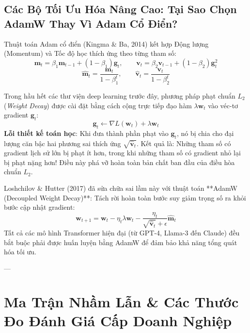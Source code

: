 \subsection{Các Bộ Tối Ưu Hóa Nâng Cao: Tại Sao Chọn AdamW Thay Vì Adam Cổ Điển?}

Thuật toán Adam cổ điển (Kingma \& Ba, 2014) kết hợp Động lượng (Momentum) và Tốc độ học thích ứng theo từng tham số:
\begin{equation}
\mathbf{m}_t = \beta_1 \mathbf{m}_{t-1} + (1 - \beta_1) \mathbf{g}_t, \qquad \mathbf{v}_t = \beta_2 \mathbf{v}_{t-1} + (1 - \beta_2) \mathbf{g}_t^2
\end{equation}
\begin{equation}
\hat{\mathbf{m}}_t = \frac{\mathbf{m}_t}{1 - \beta_1^t}, \qquad \hat{\mathbf{v}}_t = \frac{\mathbf{v}_t}{1 - \beta_2^t}
\end{equation}

Trong hầu hết các thư viện deep learning trước đây, phương pháp phạt chuẩn $L_2$ (\textit{Weight Decay}) được cài đặt bằng cách cộng trực tiếp đạo hàm $\lambda \mathbf{w}_t$ vào véc-tơ gradient $\mathbf{g}_t$:
\begin{equation}
\mathbf{g}_t \gets \nabla L(\mathbf{w}_t) + \lambda \mathbf{w}_t
\end{equation}
\textbf{Lỗi thiết kế toán học}: Khi đưa thành phần phạt vào $\mathbf{g}_t$, nó bị chia cho đại lượng căn bậc hai phương sai thích ứng $\sqrt{\hat{\mathbf{v}}_t}$. Kết quả là: Những tham số có gradient lịch sử lớn bị phạt ít hơn, trong khi những tham số có gradient nhỏ lại bị phạt nặng hơn! Điều này phá vỡ hoàn toàn bản chất ban đầu của điều hòa chuẩn $L_2$.

Loshchilov \& Hutter (2017) đã sửa chữa sai lầm này với thuật toán **AdamW (Decoupled Weight Decay)**: Tách rời hoàn toàn bước suy giảm trọng số ra khỏi bước cập nhật gradient:
\begin{equation}
\mathbf{w}_{t+1} = \mathbf{w}_t - \eta_t \lambda \mathbf{w}_t - \frac{\eta_t}{\sqrt{\hat{\mathbf{v}}_t} + \epsilon} \hat{\mathbf{m}}_t
\label{eq:adamw-update-rule}
\end{equation}
Tất cả các mô hình Transformer hiện đại (từ GPT-4, Llama-3 đến Claude) đều bắt buộc phải được huấn luyện bằng AdamW để đảm bảo khả năng tổng quát hóa tối ưu.

---

\section{Ma Trận Nhầm Lẫn \& Các Thước Đo Đánh Giá Cấp Doanh Nghiệp}
\label{sec:evaluation-metrics}

